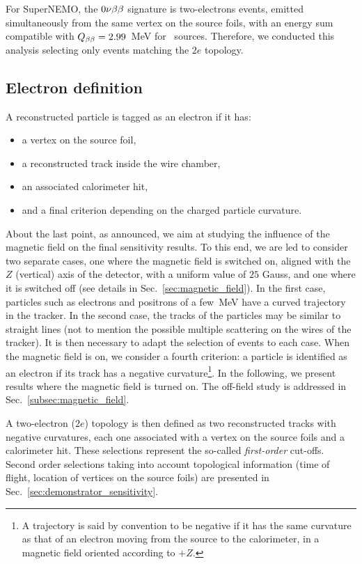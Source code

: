 For SuperNEMO, the $0\nu\beta\beta$ signature is two-electrons events, emitted simultaneously from the same vertex on the source foils, with an energy sum compatible with $Q_{\beta\beta} = 2.99$~MeV for \Se\ sources.
Therefore, we conducted this analysis selecting only events matching the $2e$ topology.

\subsection{Electron definition}

A reconstructed particle is tagged as an electron if it has:
\begin{itemize}
\item a vertex on the source foil,
\item a reconstructed track inside the wire chamber,
\item an associated calorimeter hit,
\item and a final criterion depending on the charged particle curvature.
\end{itemize}
About the last point, as announced, we aim at studying the influence of the magnetic field on the final sensitivity results.
To this end, we are led to consider two separate cases, one where the magnetic field is switched on, aligned with the $Z$ (vertical) axis of the detector, with a uniform value of $25$ Gauss, and one where it is switched off (see details in Sec.~\ref{sec:magnetic_field}).
In the first case, particles such as electrons and positrons of a few~MeV have a curved trajectory in the tracker.
In the second case, the tracks of the particles may be similar to straight lines (not to mention the possible multiple scattering on the wires of the tracker).
It is then necessary to adapt the selection of events to each case.
When the magnetic field is on, we consider a fourth criterion: a particle is identified as an electron if its track has a negative curvature\footnote{A trajectory is said by convention to be negative if it has the same curvature as that of an electron moving from the source to the calorimeter, in a magnetic field oriented according to $+Z$.}.
In the following, we present results where the magnetic field is turned on.
The off-field study is addressed in Sec.~\ref{subsec:magnetic_field}.

A two-electron ($2e$) topology is then defined as two reconstructed tracks with negative curvatures, each one associated with a vertex on the source foils and a calorimeter hit.
These selections represent the so-called \emph{first-order} cut-offs.
Second order selections taking into account topological information (time of flight, location of vertices on the source foils) are presented in Sec.~\ref{sec:demonstrator_sensitivity}.

